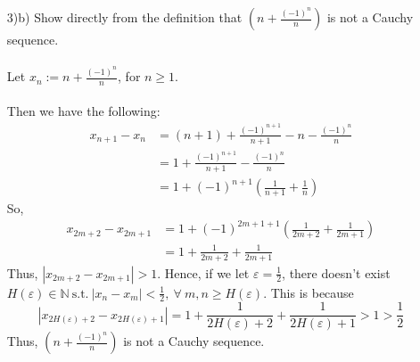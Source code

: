 \documentclass[12pt,letterpaper]{article}
\newcommand{\st}{\ \text{s.t.}\ }
\newcommand{\abs}[1]{\left\lvert #1 \right\rvert}
\newcommand{\N}{\mathbb{N}}
\theoremstyle{case}
\theoremstyle{definition}
\begin{document}
\begin{enumerate}
\begin{enumerate}
			\item[3)b)] Show directly from the definition that $\left(n+\frac{(-1)^n}{n}\right)$ is not a Cauchy sequence.
			\\\\Let $x_n:=n+\frac{(-1)^n}{n}$, for $n \geq 1$.
			\\\\Then we have the following:
			\begin{align*}
				x_{n+1}-x_n &= (n+1)+\frac{(-1)^{n+1}}{n+1}-n-\frac{(-1)^n}{n} \\
				&=1+\frac{(-1)^{n+1}}{n+1}-\frac{(-1)^n}{n} \\
				&=1+(-1)^{n+1}\left(\frac{1}{n+1}+\frac{1}{n}\right)
			\end{align*}
			So,
			\begin{align*}
				x_{2m+2}-x_{2m+1} &=1+(-1)^{2m+1+1}\left(\frac{1}{2m+2}+\frac{1}{2m+1}\right) \\
				&=1 +\frac{1}{2m+2}+\frac{1}{2m+1}
			\end{align*}
			Thus, $|x_{2m+2}-x_{2m+1}|>1$. Hence, if we let $\varepsilon=\frac{1}{2}$, there doesn't exist $H(\varepsilon) \in \N \st |x_n-x_m|<\frac{1}{2},\ \forall\ m,n \geq H(\varepsilon)$. This is because 
			\[\abs{x_{2H(\varepsilon)+2}-x_{2H(\varepsilon)+1}} = 1 + \frac{1}{2H(\varepsilon)+2}+\frac{1}{2H(\varepsilon)+1}>1>\frac{1}{2}\]
			Thus, $\left(n+\frac{(-1)^n}{n}\right)$ is not a Cauchy sequence.\\
			

\end{enumerate}
\end{enumerate}
\end{document}
